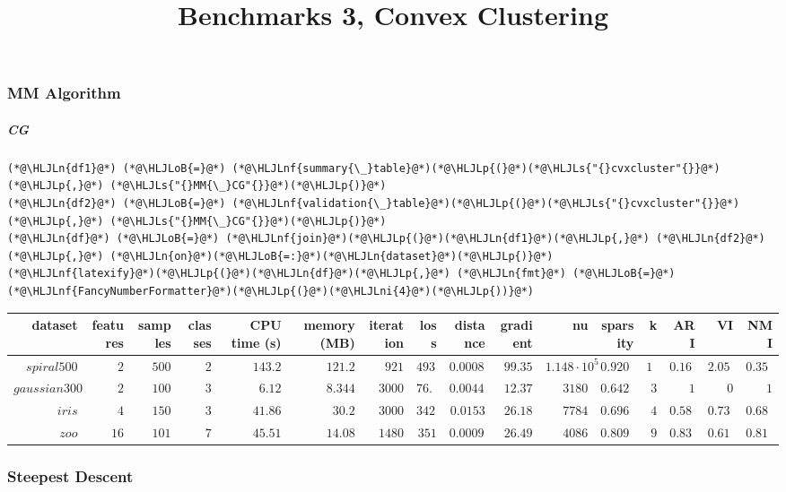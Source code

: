 \documentclass[12pt,a4paper]{article}
\title{ Benchmarks 3, Convex Clustering }
\newcommand{\HLJLn}[1]{#1}
\newcommand{\HLJLnf}[1]{\textcolor[RGB]{66,102,213}{#1}}
\newcommand{\HLJLs}[1]{\textcolor[RGB]{201,61,57}{#1}}
\newcommand{\HLJLni}[1]{\textcolor[RGB]{59,151,46}{#1}}
\newcommand{\HLJLoB}[1]{\textcolor[RGB]{102,102,102}{\textbf{#1}}}
\newcommand{\HLJLp}[1]{#1}
\begin{document}
\maketitle


\subsubsection{MM Algorithm}
\subparagraph{CG}

\begin{lstlisting}
(*@\HLJLn{df1}@*) (*@\HLJLoB{=}@*) (*@\HLJLnf{summary{\_}table}@*)(*@\HLJLp{(}@*)(*@\HLJLs{"{}cvxcluster"{}}@*)(*@\HLJLp{,}@*) (*@\HLJLs{"{}MM{\_}CG"{}}@*)(*@\HLJLp{)}@*)
(*@\HLJLn{df2}@*) (*@\HLJLoB{=}@*) (*@\HLJLnf{validation{\_}table}@*)(*@\HLJLp{(}@*)(*@\HLJLs{"{}cvxcluster"{}}@*)(*@\HLJLp{,}@*) (*@\HLJLs{"{}MM{\_}CG"{}}@*)(*@\HLJLp{)}@*)
(*@\HLJLn{df}@*) (*@\HLJLoB{=}@*) (*@\HLJLnf{join}@*)(*@\HLJLp{(}@*)(*@\HLJLn{df1}@*)(*@\HLJLp{,}@*) (*@\HLJLn{df2}@*)(*@\HLJLp{,}@*) (*@\HLJLn{on}@*)(*@\HLJLoB{=:}@*)(*@\HLJLn{dataset}@*)(*@\HLJLp{)}@*)
(*@\HLJLnf{latexify}@*)(*@\HLJLp{(}@*)(*@\HLJLn{df}@*)(*@\HLJLp{,}@*) (*@\HLJLn{fmt}@*) (*@\HLJLoB{=}@*) (*@\HLJLnf{FancyNumberFormatter}@*)(*@\HLJLp{(}@*)(*@\HLJLni{4}@*)(*@\HLJLp{))}@*)
\end{lstlisting}


\begin{tabular}
{r | r | r | r | r | r | r | r | r | r | r | r | r | r | r | r}
dataset & features & samples & classes & CPU time (s) & memory (MB) & iteration & loss & distance & gradient & nu & sparsity & k & ARI & VI & NMI \\
\hline
$spiral500$ & $2$ & $500$ & $2$ & $143.2$ & $121.2$ & $921$ & $4937$ & $0.000834$ & $99.35$ & $1.148 \cdot 10^{5}$ & $0.9206$ & $16$ & $0.1642$ & $2.056$ & $0.3511$ \\
$gaussian300$ & $2$ & $100$ & $3$ & $6.12$ & $8.344$ & $3000$ & $76.44$ & $0.004473$ & $12.37$ & $3180$ & $0.6424$ & $3$ & $1$ & $0$ & $1$ \\
$iris$ & $4$ & $150$ & $3$ & $41.86$ & $30.2$ & $3000$ & $342.7$ & $0.0153$ & $26.18$ & $7784$ & $0.6966$ & $4$ & $0.5895$ & $0.7395$ & $0.6849$ \\
$zoo$ & $16$ & $101$ & $7$ & $45.51$ & $14.08$ & $1480$ & $351$ & $0.0009192$ & $26.49$ & $4086$ & $0.8091$ & $9$ & $0.8324$ & $0.6127$ & $0.8158$ \\
\end{tabular}


\subsubsection{Steepest Descent}
\end{document}
